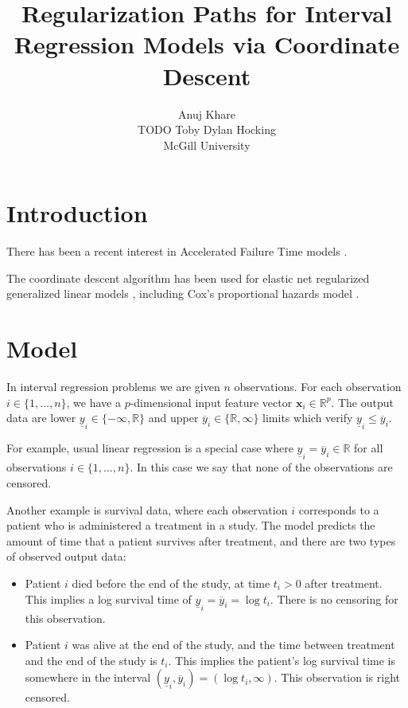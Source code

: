 \documentclass[article]{jss}
\author{Anuj Khare\\TODO \And
        Toby Dylan Hocking\\McGill University}
\title{Regularization Paths for Interval Regression Models via Coordinate Descent}
\newcommand{\RR}{\mathbb R}
\begin{document}

\section{Introduction}

There has been a recent interest in Accelerated Failure Time models
\citep{huang05, cai09, khan13}.

The coordinate descent algorithm has been used for elastic net
regularized generalized linear models \citep{glmnet}, including Cox's
proportional hazards model \citep{coxnet}.

\section{Model}

In interval regression problems we are given $n$ observations. For
each observation $i\in\{1, \dots, n\}$, we have a $p$-dimensional
input feature vector $\mathbf x_i \in \RR^p$. The output data are
lower $\underline y_i\in\{-\infty, \RR\}$ and upper
$\overline y_i\in\{\RR,\infty\}$ limits which verify
$\underline y_i \leq \overline y_i$.

For example, usual linear regression is a special case where
$\underline y_i = \overline y_i\in\RR$ for all observations
$i\in\{1, \dots, n\}$. In this case we say that none of the
observations are censored.

Another example is survival data, where each observation $i$
corresponds to a patient who is administered a treatment in a
study. The model predicts the amount of time that a patient survives
after treatment, and there are two types of observed output data:
\begin{itemize}
\item Patient $i$ died before the end of the study, at time $t_i>0$
  after treatment. This implies a log survival time of
  $\underline y_i= \overline y_i = \log t_i$. There is no censoring
  for this observation.
\item Patient $i$ was alive at the end of the study, and the time
  between treatment and the end of the study is $t_i$. This implies
  the patient's log survival time is somewhere in the interval
  $(\underline y_i, \overline y_i) = (\log t_i, \infty)$. This
  observation is right censored.
\end{itemize}
\end{document}
